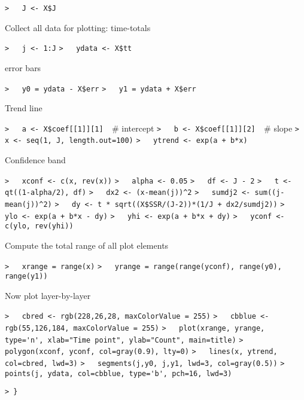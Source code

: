 \documentclass[a4paper]{article}
\begin{document}
\verb~>   J <- X$J~\par

Collect all data for plotting: time-totals\par
\verb~>   j <- 1:J~\newline
\verb~>   ydata <- X$tt~\par

error bars\par
\verb~>   y0 = ydata - X$err~\newline
\verb~>   y1 = ydata + X$err~\par

Trend line\par
\verb~>   a <- X$coef[[1]][1]  ~{\sffamily\# intercept}\newline
\verb~>   b <- X$coef[[1]][2]  ~{\sffamily\# slope}\newline
\verb~>   x <- seq(1, J, length.out=100)~\newline
\verb~>   ytrend <- exp(a + b*x)~\par

Confidence band\par
\verb~>   xconf <- c(x, rev(x))~\newline
\verb~>   alpha <- 0.05~\newline
\verb~>   df <- J - 2~\newline
\verb~>   t <- qt((1-alpha/2), df)~\newline
\verb~>   dx2 <- (x-mean(j))^2~\newline
\verb~>   sumdj2 <- sum((j-mean(j))^2)~\newline
\verb~>   dy <- t * sqrt((X$SSR/(J-2))*(1/J + dx2/sumdj2))~\newline
\verb~>   ylo <- exp(a + b*x - dy)~\newline
\verb~>   yhi <- exp(a + b*x + dy)~\newline
\verb~>   yconf <- c(ylo, rev(yhi))~\par

Compute the total range of all plot elements\par
\verb~>   xrange = range(x)~\newline
\verb~>   yrange = range(range(yconf), range(y0), range(y1))~\par

Now plot layer-by-layer\par
\verb~>   cbred <- rgb(228,26,28, maxColorValue = 255)~\newline
\verb~>   cbblue <- rgb(55,126,184, maxColorValue = 255)~\newline
\verb~>   plot(xrange, yrange, type='n', xlab="Time point", ylab="Count", main=title)~\newline
\verb~>   polygon(xconf, yconf, col=gray(0.9), lty=0)~\newline
\verb~>   lines(x, ytrend, col=cbred, lwd=3)~\newline
\verb~>   segments(j,y0, j,y1, lwd=3, col=gray(0.5))~\newline
\verb~>   points(j, ydata, col=cbblue, type='b', pch=16, lwd=3)~\par

\verb~> }~
\end{document}
